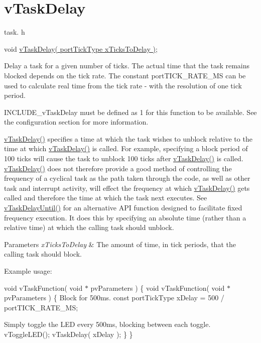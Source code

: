 \hypertarget{group__v_task_delay}{\section{v\-Task\-Delay}
\label{group__v_task_delay}
}
task. h 
\begin{DoxyPre}void \hyperlink{tasks_8c_a688c67e5456ec7c23cc2ee184d26d557}{vTaskDelay( portTickType xTicksToDelay )};\end{DoxyPre}


Delay a task for a given number of ticks. The actual time that the task remains blocked depends on the tick rate. The constant port\-T\-I\-C\-K\-\_\-\-R\-A\-T\-E\-\_\-\-M\-S can be used to calculate real time from the tick rate -\/ with the resolution of one tick period.

I\-N\-C\-L\-U\-D\-E\-\_\-v\-Task\-Delay must be defined as 1 for this function to be available. See the configuration section for more information.

\hyperlink{task_8h_a3fc5adc340b17cb07c12ffa90d7bb8f3}{v\-Task\-Delay()} specifies a time at which the task wishes to unblock relative to the time at which \hyperlink{task_8h_a3fc5adc340b17cb07c12ffa90d7bb8f3}{v\-Task\-Delay()} is called. For example, specifying a block period of 100 ticks will cause the task to unblock 100 ticks after \hyperlink{task_8h_a3fc5adc340b17cb07c12ffa90d7bb8f3}{v\-Task\-Delay()} is called. \hyperlink{task_8h_a3fc5adc340b17cb07c12ffa90d7bb8f3}{v\-Task\-Delay()} does not therefore provide a good method of controlling the frequency of a cyclical task as the path taken through the code, as well as other task and interrupt activity, will effect the frequency at which \hyperlink{task_8h_a3fc5adc340b17cb07c12ffa90d7bb8f3}{v\-Task\-Delay()} gets called and therefore the time at which the task next executes. See \hyperlink{task_8h_a3033ef5b1abc8618ea205d1082b21bb6}{v\-Task\-Delay\-Until()} for an alternative A\-P\-I function designed to facilitate fixed frequency execution. It does this by specifying an absolute time (rather than a relative time) at which the calling task should unblock.


\begin{DoxyParams}{Parameters}
{\em x\-Ticks\-To\-Delay} & The amount of time, in tick periods, that the calling task should block.\\
\hline
\end{DoxyParams}
Example usage\-:

void v\-Task\-Function( void $\ast$ pv\-Parameters ) \{ void v\-Task\-Function( void $\ast$ pv\-Parameters ) \{ Block for 500ms. const port\-Tick\-Type x\-Delay = 500 / port\-T\-I\-C\-K\-\_\-\-R\-A\-T\-E\-\_\-\-M\-S; \begin{DoxyVerb}for( ;; )
{
\end{DoxyVerb}
 Simply toggle the L\-E\-D every 500ms, blocking between each toggle. v\-Toggle\-L\-E\-D(); v\-Task\-Delay( x\-Delay ); \} \} 